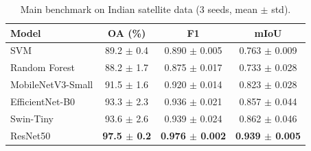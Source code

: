 \begin{table}[h]
\centering
\caption{Main benchmark on Indian satellite data (3 seeds, mean $\pm$ std).}
\label{tab:main_benchmark}
\begin{tabular}{lccc}
\toprule
Model & OA (\%) & F1 & mIoU \\
\midrule
SVM & 89.2 $\pm$ 0.4 & 0.890 $\pm$ 0.005 & 0.763 $\pm$ 0.009 \\
Random Forest & 88.2 $\pm$ 1.7 & 0.875 $\pm$ 0.017 & 0.733 $\pm$ 0.028 \\
\midrule
MobileNetV3-Small & 91.5 $\pm$ 1.6 & 0.920 $\pm$ 0.014 & 0.823 $\pm$ 0.028 \\
EfficientNet-B0 & 93.3 $\pm$ 2.3 & 0.936 $\pm$ 0.021 & 0.857 $\pm$ 0.044 \\
Swin-Tiny & 93.6 $\pm$ 2.6 & 0.939 $\pm$ 0.024 & 0.862 $\pm$ 0.046 \\
ResNet50 & \textbf{97.5 $\pm$ 0.2} & \textbf{0.976 $\pm$ 0.002} & \textbf{0.939 $\pm$ 0.005} \\
\bottomrule
\end{tabular}
\end{table}